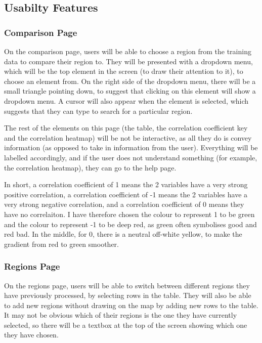 \documentclass[12pt]{report}
\begin{document}
\subsection{Usabilty Features}
\subsubsection{Comparison Page}
On the comparison page, users will be able to choose a region from the training data to compare their region to. They will be presented with a dropdown menu, which will be the top element in the screen (to draw their attention to it), to choose an element from. On the right side of the dropdown menu, there will be a small triangle pointing down, to suggest that clicking on this element will show a dropdown menu. A cursor will also appear when the element is selected, which suggests that they can type to search for a particular region.

The rest of the elements on this page (the table, the correlation coefficient key and the correlation heatmap) will be not be interactive, as all they do is convey information (as opposed to take in information from the user). Everything will be labelled accordingly, and if the user does not understand something (for example, the correlation heatmap), they can go to the help page.

In short, a correlation coefficient of 1 means the 2 variables have a very strong positive correlation, a correlation coefficient of -1 means the 2 variables have a very strong negative correlation, and a correlation coefficient of 0 means they have no correlaiton. I have therefore chosen the colour to represent 1 to be green and the colour to represent -1 to be deep red, as green often symbolises good and red bad. In the middle, for 0, there is a neutral off-white yellow, to make the gradient from red to green smoother.

\subsubsection{Regions Page}
On the regions page, users will be able to switch between different regions they have previously processed, by selecting rows in the table. They will also be able to add new regions without drawing on the map by adding new rows to the table. It may not be obvious which of their regions is the one they have currently selected, so there will be a textbox at the top of the screen showing which one they have chosen.
\end{document}
